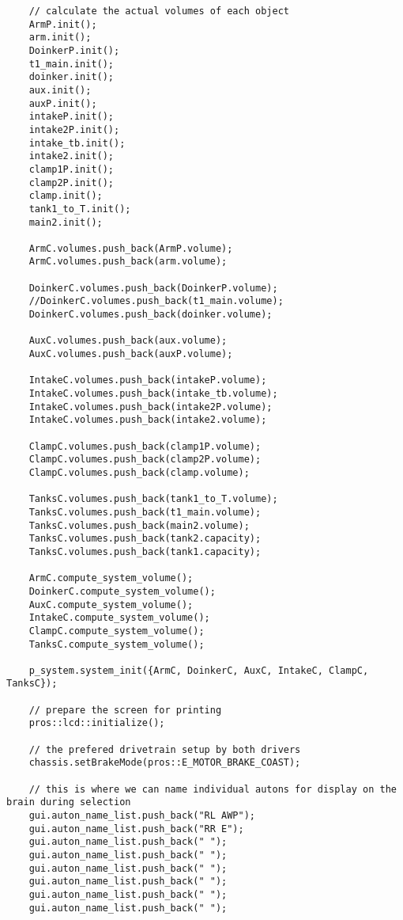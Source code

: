 \begin{verbatim}
    // calculate the actual volumes of each object
    ArmP.init();
    arm.init();
    DoinkerP.init();
    t1_main.init();
    doinker.init();
    aux.init();
    auxP.init();
    intakeP.init();
    intake2P.init();
    intake_tb.init();
    intake2.init();
    clamp1P.init();
    clamp2P.init();
    clamp.init();
    tank1_to_T.init();
    main2.init();

    ArmC.volumes.push_back(ArmP.volume);
    ArmC.volumes.push_back(arm.volume);

    DoinkerC.volumes.push_back(DoinkerP.volume);
    //DoinkerC.volumes.push_back(t1_main.volume);
    DoinkerC.volumes.push_back(doinker.volume);

    AuxC.volumes.push_back(aux.volume);
    AuxC.volumes.push_back(auxP.volume);

    IntakeC.volumes.push_back(intakeP.volume);
    IntakeC.volumes.push_back(intake_tb.volume);
    IntakeC.volumes.push_back(intake2P.volume);
    IntakeC.volumes.push_back(intake2.volume);

    ClampC.volumes.push_back(clamp1P.volume);
    ClampC.volumes.push_back(clamp2P.volume);
    ClampC.volumes.push_back(clamp.volume);

    TanksC.volumes.push_back(tank1_to_T.volume);
    TanksC.volumes.push_back(t1_main.volume);
    TanksC.volumes.push_back(main2.volume);
    TanksC.volumes.push_back(tank2.capacity);
    TanksC.volumes.push_back(tank1.capacity);

    ArmC.compute_system_volume();
    DoinkerC.compute_system_volume();
    AuxC.compute_system_volume();
    IntakeC.compute_system_volume();
    ClampC.compute_system_volume();
    TanksC.compute_system_volume();

    p_system.system_init({ArmC, DoinkerC, AuxC, IntakeC, ClampC, TanksC});

    // prepare the screen for printing
    pros::lcd::initialize();

    // the prefered drivetrain setup by both drivers
    chassis.setBrakeMode(pros::E_MOTOR_BRAKE_COAST);

    // this is where we can name individual autons for display on the brain during selection
    gui.auton_name_list.push_back("RL AWP");
    gui.auton_name_list.push_back("RR E");
    gui.auton_name_list.push_back(" ");
    gui.auton_name_list.push_back(" ");
    gui.auton_name_list.push_back(" ");
    gui.auton_name_list.push_back(" ");
    gui.auton_name_list.push_back(" ");
    gui.auton_name_list.push_back(" ");


\end{verbatim}
